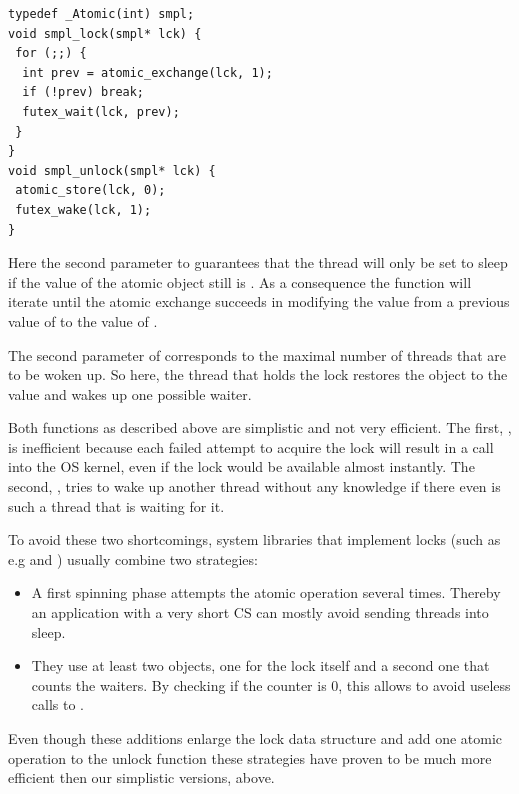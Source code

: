 \lstset{language=C11,label= ,caption= ,numbers=none}
\begin{lstlisting}
typedef _Atomic(int) smpl;
void smpl_lock(smpl* lck) {
 for (;;) {
  int prev = atomic_exchange(lck, 1);
  if (!prev) break;
  futex_wait(lck, prev);
 }
}
void smpl_unlock(smpl* lck) {
 atomic_store(lck, 0);
 futex_wake(lck, 1);
}
\end{lstlisting}

\iflong%
Here the second parameter to  guarantees that the thread
will only be set to sleep if the value of the atomic object 
still is . As a consequence the  function will iterate until the
atomic exchange succeeds in modifying the value from a previous
value of  to the value of .

The second parameter of  corresponds to the maximal
number of threads that are to be woken up. So here, the thread that
holds the lock restores the object  to the value  and wakes
up one possible waiter.
\fi

Both functions as described above are simplistic and not very
efficient. The first, , is inefficient because each failed
attempt to acquire the lock will result in a call into the OS
kernel, even if the lock would be available almost instantly.  The
second, , tries to wake up another thread without any
knowledge if there even is such a thread that is waiting for it.

\iflong
To avoid these two shortcomings, system libraries that implement
locks (such as e.g  and ) usually combine two
strategies:\itemadjust

\begin{itemize}
\item A first spinning phase attempts the atomic operation several
times. Thereby an application with a very short CS can mostly
avoid sending threads into sleep.\itemadjust

\item They use at least two  objects, one for the lock itself
and a second one that counts the waiters. By checking if the
counter is 0, this allows to avoid useless calls to
.\itemadjust
\end{itemize}

Even though these additions enlarge the lock data structure and add
one atomic operation to the unlock function these strategies have
proven to be much more efficient then our simplistic versions,
above.
\fi

